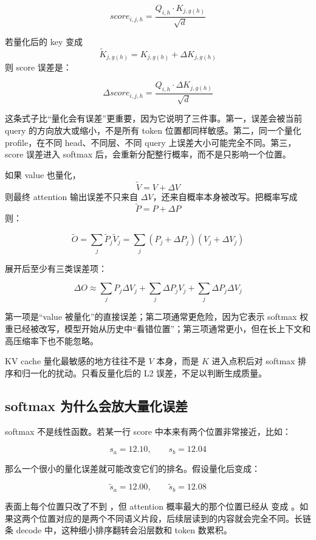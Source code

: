 \[
score_{i,j,h}=
\frac{Q_{i,h}\cdot K_{j,g(h)}}{\sqrt{d}}
\]

若量化后的 key 变成
\[
\tilde{K}_{j,g(h)} = K_{j,g(h)} + \Delta K_{j,g(h)}
\]
则 score 误差是：

\[
\Delta score_{i,j,h}
=
\frac{Q_{i,h}\cdot \Delta K_{j,g(h)}}{\sqrt{d}}
\]

这条式子比“量化会有误差”更重要，因为它说明了三件事。第一，误差会被当前 query 的方向放大或缩小，不是所有 token 位置都同样敏感。第二，同一个量化 profile，在不同 head、不同层、不同 query 上误差大小可能完全不同。第三，score 误差进入 softmax 后，会重新分配整行概率，而不是只影响一个位置。

如果 value 也量化，
\[
\tilde{V}=V+\Delta V
\]
则最终 attention 输出误差不只来自 \(\Delta V\)，还来自概率本身被改写。把概率写成
\[
\tilde{P}=P+\Delta P
\]
则：

\[
\tilde{O}
=
\sum_j \tilde{P}_j \tilde{V}_j
=
\sum_j (P_j+\Delta P_j)(V_j+\Delta V_j)
\]

展开后至少有三类误差项：

\[
\Delta O
\approx
\sum_j P_j \Delta V_j
+
\sum_j \Delta P_j V_j
+
\sum_j \Delta P_j \Delta V_j
\]

第一项是“value 被量化”的直接误差；第二项通常更危险，因为它表示 softmax 权重已经被改写，模型开始从历史中“看错位置”；第三项通常更小，但在长上下文和高压缩率下也不能忽略。

\begin{keyidea}
KV cache 量化最敏感的地方往往不是 \(V\) 本身，而是 \(K\) 进入点积后对 softmax 排序和归一化的扰动。只看反量化后的 L2 误差，不足以判断生成质量。
\end{keyidea}

\subsection{softmax 为什么会放大量化误差}

softmax 不是线性函数。若某一行 score 中本来有两个位置非常接近，比如：

\[
s_a = 12.10,\qquad s_b = 12.04
\]

那么一个很小的量化误差就可能改变它们的排名。假设量化后变成：

\[
\tilde{s}_a = 12.00,\qquad \tilde{s}_b = 12.08
\]

表面上每个位置只改了不到 ，但 attention 概率最大的那个位置已经从  变成 。如果这两个位置对应的是两个不同语义片段，后续层读到的内容就会完全不同。长链条 decode 中，这种细小排序翻转会沿层数和 token 数累积。

